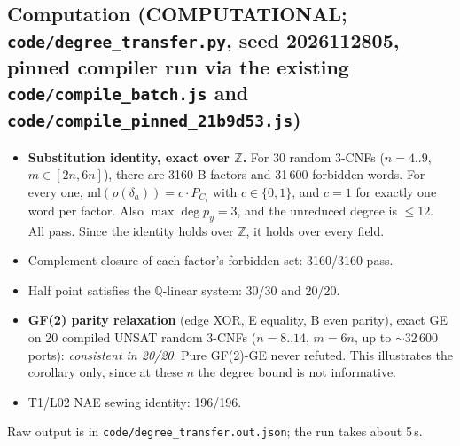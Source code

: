 \documentclass[11pt]{article}
\theoremstyle{definition}
\begin{document}
\subsection*{Computation (COMPUTATIONAL; \texttt{code/degree\_transfer.py}, seed 2026112805, pinned compiler run via the existing \texttt{code/compile\_batch.js} and \texttt{code/compile\_pinned\_21b9d53.js})}
\begin{itemize}
\item[(A)] \textbf{Substitution identity, exact over $\mathbb Z$.} For 30 random 3-CNFs ($n=4..9$, $m\in[2n,6n]$), there are 3160 B factors and 31\,600 forbidden words. For every one, $\mathrm{ml}(\rho(\delta_a))=c\cdot P_{C_i}$ with $c\in\{0,1\}$, and $c=1$ for exactly one word per factor. Also $\max\deg p_y=3$, and the unreduced degree is $\le12$. All pass. Since the identity holds over $\mathbb Z$, it holds over every field.
\item[(B)] Complement closure of each factor's forbidden set: 3160/3160 pass.
\item[(C)] Half point satisfies the $\mathbb Q$-linear system: 30/30 and 20/20.
\item[(D)] \textbf{GF(2) parity relaxation} (edge XOR, E equality, B even parity), exact GE on 20 compiled UNSAT random 3-CNFs ($n=8..14$, $m=6n$, up to $\sim$32\,600 ports): \emph{consistent in 20/20}. Pure GF(2)-GE never refuted. This illustrates the corollary only, since at these $n$ the degree bound is not informative.
\item[(E)] T1/L02 NAE sewing identity: 196/196.
\end{itemize}
Raw output is in \texttt{code/degree\_transfer.out.json}; the run takes about 5\,s.
\end{document}
